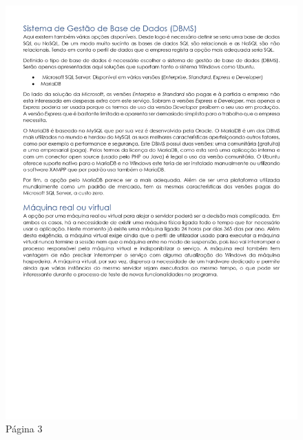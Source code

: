 \begin{figure}[H]
	\centering
	\includegraphics[width=\linewidth, frame]{figuras/Alternativas/pag3.jpg}
	\caption{Página 3}
	\label{fig:anexo_a_3}
\end{figure}
\newpage

